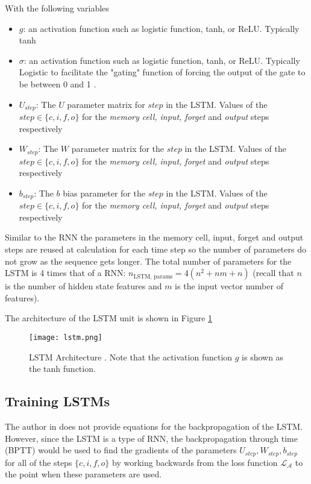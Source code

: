 With the following variables

\begin{itemize}
    \item $g$: an activation function such as logistic function, tanh, or ReLU. Typically tanh \cite{salemRecurrentNeuralNetworks2022}
    \item $\sigma$: an activation function such as logistic function, tanh, or ReLU. Typically Logistic to facilitate the "gating" function of forcing the output of the gate to be between 0 and 1 \cite{salemRecurrentNeuralNetworks2022}.
    \item $U_{step}$: The $U$ parameter matrix for $step$ in the LSTM. Values of the $step \in \{c, i, f, o\}$ for the \textit{memory cell, input, forget} and \textit{output} steps respectively
    \item $W_{step}$: The $W$ parameter matrix for the $step$ in the LSTM. Values of the $step \in \{c, i, f, o\}$ for the \textit{memory cell, input, forget} and \textit{output} steps respectively
    \item $b_{step}$: The $b$ bias parameter for the $step$ in the LSTM. Values of the $step \in \{c, i, f, o\}$ for the \textit{memory cell, input, forget} and \textit{output} steps respectively
\end{itemize}

Similar to the RNN the parameters in the memory cell, input, forget and output steps are reused at calculation for each time step so the number of parameters do not grow as the sequence gets longer. The total number of parameters for the LSTM is 4 times that of a RNN: $n_\text{LSTM, params} = 4(n^2 + nm + n)$ (recall that $n$ is the number of hidden state features and $m$ is the input vector number of features).

The architecture of the LSTM unit is shown in Figure \ref{fig:lstm-arch}

\begin{figure}[ht]
    \centering
    \texttt{[image: lstm.png]}
    \caption{LSTM Architecture \cite{salemRecurrentNeuralNetworks2022}. Note that the activation function $g$ is shown as the tanh function.}
    \label{fig:lstm-arch}
\end{figure}

\subsection{Training LSTMs}
The author in \cite{salemRecurrentNeuralNetworks2022} does not provide equations for the backpropagation of the LSTM. However, since the LSTM is a type of RNN, the backpropagation through time (BPTT) would be used to find the gradients of the parameters $U_{step}, W_{step}, b_{step}$ for all of the steps $\{c, i, f, o\}$ by working backwards from the loss function $\mathcal{L}_\mathcal{A}$ to the point when these parameters are used. 

